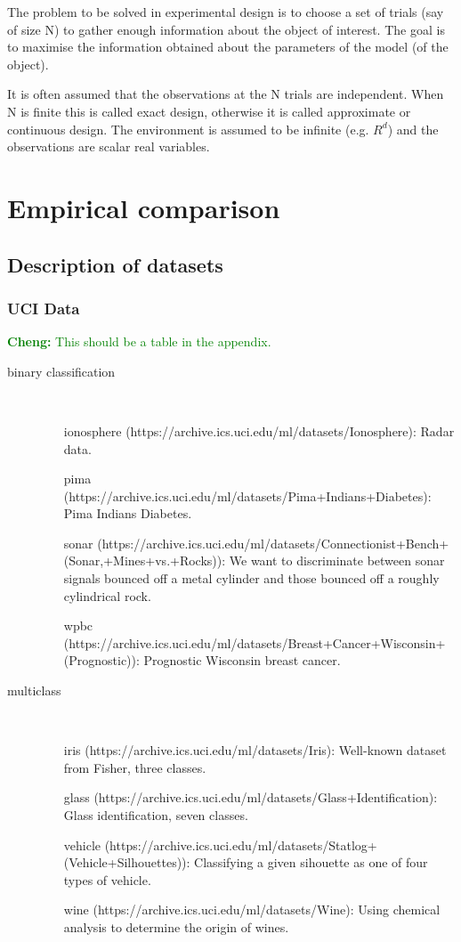 \documentclass[fleqn,10pt,lineno]{wlpeerj} %
\newcommand{\cheng}[1]{\textcolor{green}{\textbf{Cheng: }{\footnotesize #1}}}
\begin{document}
The problem to be solved in experimental design is to choose a set of
trials (say of size N) to gather enough information about the object
of interest. The goal is to maximise the information obtained about
the parameters of the model (of the object).

It is often assumed that the observations at the N trials are
independent. When N is finite this is called exact design, otherwise
it is called approximate or continuous design. The environment is
assumed to be infinite (e.g. $R^d$) and the observations are scalar real variables.




\section*{Empirical comparison}

\subsection*{Description of datasets}

\subsubsection*{UCI Data}


\cheng{This should be a table in the appendix.}
\begin{description}
  \item[binary classification]\
  \begin{itemize}
      \item [ionosphere](https://archive.ics.uci.edu/ml/datasets/Ionosphere): Radar data.
      \item [pima](https://archive.ics.uci.edu/ml/datasets/Pima+Indians+Diabetes): Pima Indians Diabetes.
      \item [sonar](https://archive.ics.uci.edu/ml/datasets/Connectionist+Bench+(Sonar,+Mines+vs.+Rocks)): We want to discriminate between sonar signals bounced off a metal cylinder and those bounced off a roughly cylindrical rock.
      \item [wpbc](https://archive.ics.uci.edu/ml/datasets/Breast+Cancer+Wisconsin+(Prognostic)): Prognostic Wisconsin breast cancer.
  \end{itemize}
  \item[multiclass]\
  \begin{itemize}
    \item [iris](https://archive.ics.uci.edu/ml/datasets/Iris): Well-known dataset from Fisher, three classes.
    \item [glass](https://archive.ics.uci.edu/ml/datasets/Glass+Identification): Glass identification, seven classes.
    \item [vehicle](https://archive.ics.uci.edu/ml/datasets/Statlog+(Vehicle+Silhouettes)): Classifying a given sihouette as one of four types of vehicle.
    \item [wine](https://archive.ics.uci.edu/ml/datasets/Wine): Using chemical analysis to determine the origin of wines.
  \end{itemize}
\end{description}
\end{document}
